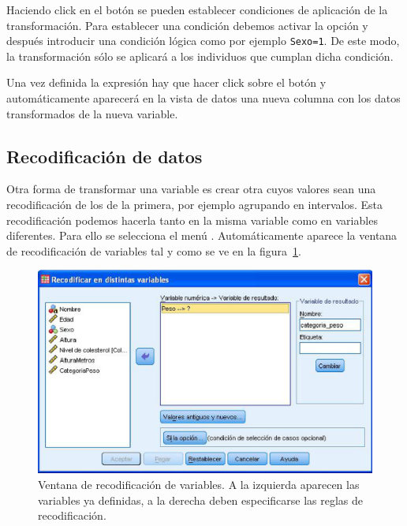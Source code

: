 Haciendo click en el botón  se pueden establecer condiciones de aplicación de la transformación. Para establecer una condición debemos activar la opción  y  después introducir una condición lógica como por ejemplo \texttt{Sexo=1}. De este modo, la transformación sólo se aplicará a los individuos que cumplan dicha condición.

Una vez definida la expresión hay que hacer click sobre el botón  y automáticamente aparecerá en la vista de datos una nueva columna con los datos transformados de la nueva variable. 

\subsection{Recodificación de datos}
Otra forma de transformar una variable es crear otra cuyos valores sean una recodificación de los de la primera, por ejemplo agrupando en intervalos. Esta recodificación podemos hacerla tanto en la misma variable como en variables diferentes. Para ello se selecciona el menú . Automáticamente aparece la ventana de recodificación de variables tal y como se ve en la figura~\ref{g:recodificacion}.

\begin{figure}[h!]
\begin{center}
\includegraphics[scale=0.6]{introduccion_spss/img/recodificacion}
\caption{Ventana de recodificación de variables. A la izquierda aparecen las variables ya definidas, a la derecha deben especificarse las reglas de recodificación.}
\label{g:recodificacion}
\end{center}
\end{figure}


